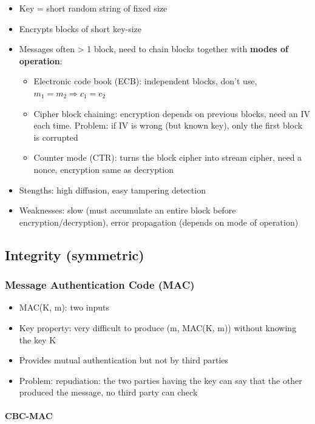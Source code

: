 \documentclass{article}
\newenvironment{myitemize}
{ \begin{itemize}
    \setlength{\itemsep}{005pt}
    \setlength{\parskip}{0pt}
    \setlength{\parsep}{0pt}     }
{ \end{itemize}                  }
\begin{document}
\begin{multicols}{2}
\begin{myitemize}
    \item Key = short random string of fixed size
    \item Encrypts blocks of short key-size
    \item Messages often > 1 block, need to chain blocks together with \textbf{modes of operation}:
    \begin{myitemize}
        \item Electronic code book (ECB): independent blocks, don't use, $m_1=m_2 \Rightarrow c_1=c_2$
        \item Cipher block chaining: encryption depends on previous blocks, need an IV each time. Problem: if IV is wrong (but known key), only the first block is corrupted
        \item Counter mode (CTR): turns the block cipher into stream cipher, need a nonce, encryption same as decryption
    \end{myitemize}
    \item Stengths: high diffusion, easy tampering detection
    \item Weaknesses: slow (must accumulate an entire block before encryption/decryption), error propagation (depends on mode of operation)
\end{myitemize}


\subsection{Integrity (symmetric)}

\subsubsection{Message Authentication Code (MAC)}

\begin{myitemize}
    \item MAC(K, m): two inputs
    \item Key property: very difficult to produce (m, MAC(K, m)) without knowing the key K
    \item Provides mutual authentication but not by third parties
    \item Problem: repudiation: the two parties having the key can say that the other produced the message, no third party can check
    
\end{myitemize}

\paragraph{CBC-MAC}


\end{multicols}
\end{document}

